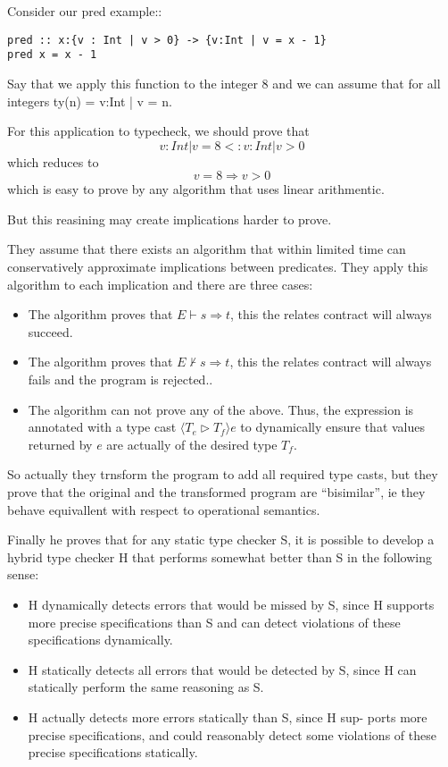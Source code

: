 Consider our pred example::

\begin{verbatim}
pred :: x:{v : Int | v > 0} -> {v:Int | v = x - 1}
pred x = x - 1
\end{verbatim}

Say that we apply this function to the integer 8
and we can assume that  for all integers ty(n) = {v:Int | v = n}.

For this application to typecheck, we should prove that 
$$ {v:Int | v = 8} <: {v : Int | v > 0} $$
which reduces to 
$$ v = 8 \Rightarrow v > 0 $$
which is easy to prove by any algorithm that uses linear arithmentic.

But this reasining may create implications harder to prove.

They assume that 
there exists an algorithm that within limited time can
conservatively approximate implications between predicates.
They apply this algorithm to each implication and there are three cases:
\begin{itemize}
\item The algorithm proves that $E \vdash s \Rightarrow t$, this the relates contract
will always succeed.
\item The algorithm proves that $E \nvdash s \Rightarrow t$, this the relates contract
will always fails and the program is rejected..
\item The algorithm can not prove any of the above.
Thus, the expression is annotated with a type cast $\langle T_e \vartriangleright T_f\rangle e$
to dynamically ensure that values returned by $e$ are actually of the desired type $T_f$.
\end{itemize}

So actually they trnsform the program to add all required type casts, but they prove that
the original and the transformed program are ``bisimilar'', ie they behave equivallent with respect to 
operational semantics.

Finally he proves that for any static type checker S, it is possible to 
develop a hybrid type checker H
that performs somewhat better than S in the following sense:
\begin{itemize}
\item H dynamically detects errors that would be missed by S, since
H supports more precise specifications than S and can detect
violations of these specifications dynamically.
\item H statically detects all errors that would be detected by S, since
H can statically perform the same reasoning as S.
\item H actually detects more errors statically than S, since H sup-
ports more precise specifications, and could reasonably detect
some violations of these precise specifications statically.
\end{itemize}

